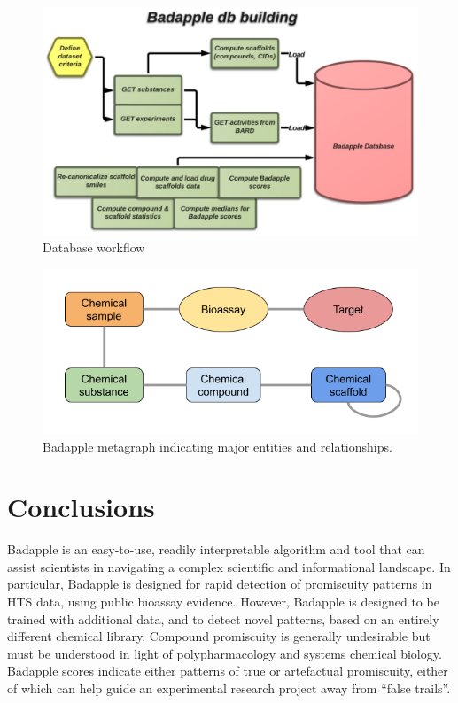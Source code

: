 \begin{figure}
	\includegraphics[width=\textwidth]{figures/badapple/Badapple_Fig7.png}
	\caption{Database workflow}
	\label{fig:BA_07}
\end{figure}


\begin{figure}
	\includegraphics[width=\textwidth]{figures/badapple/Badapple_metagraph.png}
	\caption{Badapple metagraph indicating major entities and relationships.}
	\label{fig:Badapple_metagraph}
\end{figure}

\section{Conclusions}

Badapple is an easy-to-use, readily interpretable algorithm and tool that can assist scientists in navigating a complex scientific and informational landscape. In particular, Badapple is designed for rapid detection of promiscuity patterns in HTS data, using public bioassay evidence. However, Badapple is designed to be trained with additional data, and to detect novel patterns, based on an entirely different chemical library. Compound promiscuity is generally undesirable but must be understood in light of polypharmacology and systems chemical biology. Badapple scores indicate either patterns of true or artefactual promiscuity, either of which can help guide an experimental research project away from “false trails”.

